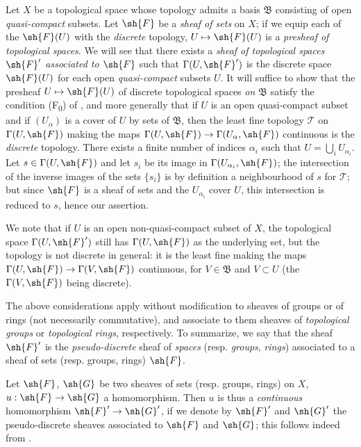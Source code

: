 \begin{env}[3.8.1]
\label{0.3.8.1}
Let $X$ be a topological space whose topology admits a basis $\mathfrak{B}$
consisting of open \emph{quasi-compact} subsets. Let $\sh{F}$ be a \emph{sheaf
of sets} on $X$; if we equip each of the $\sh{F}(U)$ with the \emph{discrete}
topology, $U\mapsto\sh{F}(U)$ is a \emph{presheaf of topological spaces}. We
will see that there exists a \emph{sheaf of topological spaces $\sh{F}'$
associated to $\sh{F}$}  such that $\Gamma(U,\sh{F}')$ is the
discrete space $\sh{F}(U)$ for each open \emph{quasi-compact} subsets $U$. It
will suffice to show that the presheaf $U\mapsto\sh{F}(U)$ of discrete
topological spaces \emph{on $\mathfrak{B}$} satisfy the condition (F\textsubscript{0}) of
, and more generally that if $U$ is an open quasi-compact
subset and if $(U_\alpha)$ is a cover of $U$ by sets of $\mathfrak{B}$, then the
least fine topology $\mathcal{T}$ on $\Gamma(U,\sh{F})$ making the
maps $\Gamma(U,\sh{F})\to\Gamma(U_\alpha,\sh{F})$ continuous is the \emph{discrete}
topology. There exists a finite number of indices $\alpha_i$ such that
$U=\bigcup_i U_{\alpha_i}$. Let $s\in\Gamma(U,\sh{F})$ and let $s_i$ be its
image in $\Gamma(U_{\alpha_i},\sh{F})$; the intersection of the inverse images
of the sets $\{s_i\}$ is by definition a neighbourhood of $s$ for $\mathcal{T}$;
but since $\sh{F}$ is a sheaf of sets and the $U_{\alpha_i}$ cover $U$, this
intersection is reduced to $s$, hence our assertion.

We note that if $U$ is an open non-quasi-compact subset of $X$, the topological
space $\Gamma(U,\sh{F}')$ still has $\Gamma(U,\sh{F})$ as the underlying set,
but the topology is not discrete in general: it is the least fine making
the maps $\Gamma(U,\sh{F})\to\Gamma(V,\sh{F})$ continuous, for
$V\in\mathfrak{B}$ and $V\subset U$ (the $\Gamma(V,\sh{F})$ being discrete).

The above considerations apply without modification to sheaves of groups or of
rings (not necessarily commutative), and associate to them sheaves of
\emph{topological groups} or \emph{topological rings}, respectively. To
summarize, we say that the sheaf $\sh{F}'$ is the \emph{pseudo-discrete} sheaf
of \emph{spaces} (resp. \emph{groups}, \emph{rings}) associated to a sheaf of
sets (resp. groups, rings) $\sh{F}$.
\end{env}

\begin{env}[3.8.2]
\label{0.3.8.2}
Let $\sh{F}$, $\sh{G}$ be two sheaves of sets (resp. groups, rings) on $X$,
$u:\sh{F}\to\sh{G}$ a homomorphism. Then $u$ is thus a \emph{continuous}
homomorphism $\sh{F}'\to\sh{G}'$, if we denote by $\sh{F}'$ and $\sh{G}'$ the
pseudo-discrete sheaves associated to $\sh{F}$ and $\sh{G}$; this follows
indeed from .
\end{env}

